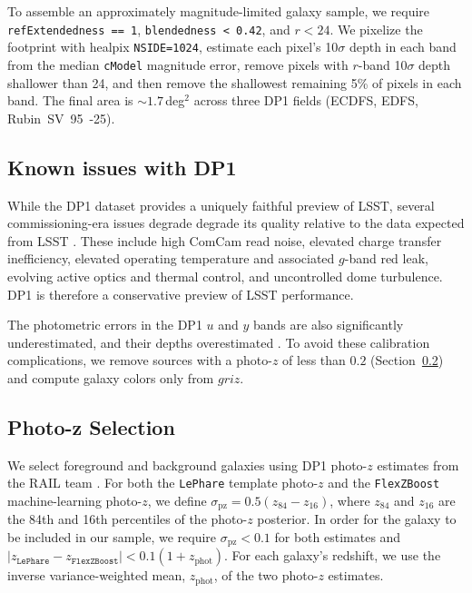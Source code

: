 \documentclass[linenumbers, twocolumn]{aastex701}
\begin{document}
To assemble an approximately magnitude-limited galaxy sample, we require \texttt{refExtendedness == 1}, \texttt{blendedness < 0.42}, and $r < 24$.
We pixelize the footprint with healpix \texttt{NSIDE=1024}, estimate each pixel's 10$\sigma$ depth in each band from the median \texttt{cModel} magnitude error, remove pixels with $r$-band 10$\sigma$ depth shallower than 24, and then remove the shallowest remaining 5\% of pixels in each band.
The final area is $\sim 1.7$\,deg$^2$ across three DP1 fields (ECDFS, EDFS, Rubin~SV~95~-25).


\subsection{Known issues with DP1}
\label{sec:dp1-issues}

While the DP1 dataset provides a uniquely faithful preview of LSST, several commissioning-era issues degrade degrade its quality relative to the data expected from LSST \citep{dp1}.
These include high ComCam read noise, elevated charge transfer inefficiency, elevated operating temperature and associated $g$-band red leak, evolving active optics and thermal control, and uncontrolled dome turbulence.
DP1 is therefore a conservative preview of LSST performance.

The photometric errors in the DP1 $u$ and $y$ bands are also significantly underestimated, and their depths overestimated \citep{SITCOMTN-154}.
To avoid these calibration complications, we remove sources with a photo-$z$ of less than $ 0.2$ (Section~\ref{sec:photoz}) and compute galaxy colors only from $griz$.

\subsection{Photo-z Selection}
\label{sec:photoz}

We select foreground and background galaxies using DP1 photo-$z$ estimates from the RAIL team \citep{zhang2025b,rail}.
For both the \texttt{LePhare} \citep{lephare1,lephare2} template photo-$z$ and the \texttt{FlexZBoost} \citep{flexzboost} machine-learning photo-$z$, we define $\sigma_\text{pz} = 0.5 (z_{84} - z_{16})$, where $z_{84}$ and $z_{16}$ are the 84th and 16th percentiles of the photo-$z$ posterior.  In order for the galaxy to be included in our sample, we require $\sigma_\text{pz} < 0.1$ for both estimates and $|z_\texttt{LePhare} - z_\texttt{FlexZBoost}| < 0.1 (1 + z_\text{phot})$.
For each galaxy's redshift, we use the inverse variance-weighted mean, $z_\text{phot}$, of the two photo-$z$ estimates.
\end{document}
